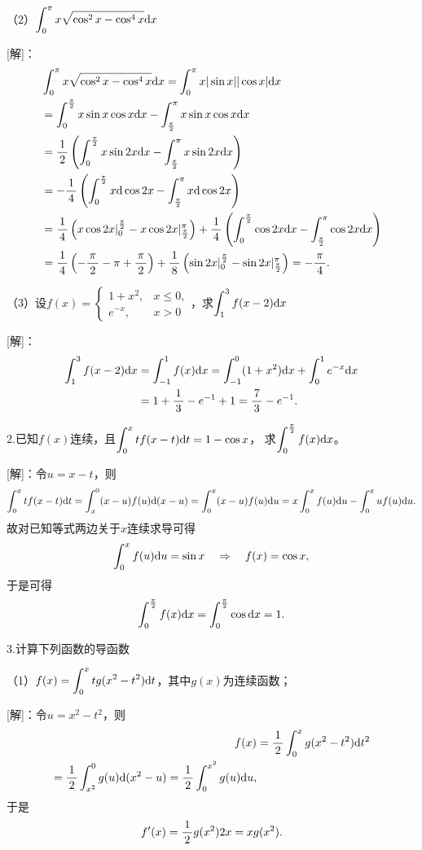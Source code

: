 （2）$\dint_0^{\pi}x\sqrt{\cos^2x-\cos^4x}\d x$

[解]：
\begin{align*}
	&\dint_0^{\pi}x\sqrt{\cos^2x-\cos^4x}\d x
	=\dint_0^{\pi}x|\sin x||\cos x|\d x\\
	&=\dint_0^{\frac{\pi}2}x\sin x\cos x\d x
	-\dint_{\frac{\pi}2}^{\pi}x\sin x\cos x\d x\\
	&=\df12\left(\dint_0^{\frac{\pi}2}x\sin2x\d x
	-\dint_{\frac{\pi}2}^{\pi}x\sin2x\d x\right)\\
	&=-\df14\left(\dint_0^{\frac{\pi}2}x\d\cos2x
	-\dint_{\frac{\pi}2}^{\pi}x\d\cos2x\right)\\
	&=\df14\left(x\cos2x|_0^{\frac{\pi}2}
	-x\cos2x|_{\frac{\pi}2}^{\pi}\right)+
	\df14\left(\dint_0^{\frac{\pi}2}\cos2x\d x
	-\dint_{\frac{\pi}2}^{\pi}\cos2x\d x\right)\\
	&=\df14\left(-\df{\pi}2-\pi+\df{\pi}2\right)
	+\df18\left(\sin2x|_0^{\frac{\pi}2}
	-\sin2x|_{\frac{\pi}2}^{\pi}\right)=-\df{\pi}4.
\end{align*}

（3）设$f(x)=\left\{\begin{array}{ll}
	1+x^2, & x\leq0,\\ e^{-x}, & x>0
\end{array}\right.$，求$\dint_1^3f(x-2)\d x$

[解]：
\begin{align*}
	\dint_1^3f(x-2)\d x
	&=\dint_{-1}^1f(x)\d x
	=\dint_{-1}^0(1+x^2)\d x+\dint_0^1e^{-x}\d x\\
	&=1+\df13-e^{-1}+1=\df73-e^{-1}.
\end{align*}
\fin

\bs

2.已知$f(x)$连续，且$\dint_0^xtf(x-t)\d t=1-\cos x$，
求$\dint_0^{\frac{\pi}2}f(x)\d x$。

[解]：令$u=x-t$，则
$$\dint_0^xtf(x-t)\d t=\dint_x^0(x-u)f(u)\d(x-u)
=\dint_0^x(x-u)f(u)\d u=x\dint_0^xf(u)\d u-\dint_0^xuf(u)\d u.$$
故对已知等式两边关于$x$连续求导可得
$$\dint_0^xf(u)\d u=\sin x
\quad\Rightarrow\quad
f(x)=\cos x,$$
于是可得
$$\dint_0^{\frac{\pi}2}f(x)\d x=\dint_0^{\frac{\pi}2}\cos\d x=1.$$
\fin

\bs

3.计算下列函数的导函数

（1）$f(x)=\dint_0^xtg(x^2-t^2)\d t$，其中$g(x)$为连续函数；

[解]：令$u=x^2-t^2$，则
\begin{align*}
	f(x)&=\df12\dint_0^xg(x^2-t^2)\d t^2\\
	=\df12\dint_{x^2}^0g(u)\d(x^2-u)
	=\df12\dint_0^{x^2}g(u)\d u,
\end{align*}
于是
$$f'(x)=\df12g(x^2)2x=xg(x^2).$$


